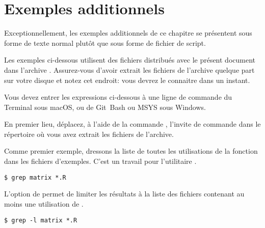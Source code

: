 

\section{Exemples additionnels}
\label{sec:texte:exemples}

Exceptionnellement, les exemples additionnels de ce chapitre se
présentent sous forme de texte normal plutôt que sous forme de fichier
de script.

Les exemples ci-dessous utilisent des fichiers distribués avec le
présent document dans l'archive .
Assurez-vous d'avoir extrait les fichiers de l'archive quelque part
sur votre disque et notez cet endroit: vous devrez le connaitre dans
un instant.

Vous devez entrer les expressions ci-dessous à une ligne de commande
du Terminal sous macOS, ou de Git~Bash
ou MSYS sous Windows.


En premier lieu, déplacez, à l'aide de la commande ,
l'invite de commande dans le répertoire où vous avez extrait les
fichiers de l'archive.

Comme premier exemple, dressons la liste de toutes les utilisations de
la fonction  dans les fichiers d'exemples. C'est un
travail pour l'utilitaire .
\begin{Schunk}
\begin{Verbatim}
$ grep matrix *.R
\end{Verbatim}
\end{Schunk}

L'option  de  permet de limiter les résultats à
la liste des fichiers contenant au moins une utilisation de
.
\begin{Schunk}
\begin{Verbatim}
$ grep -l matrix *.R
\end{Verbatim}
\end{Schunk}

